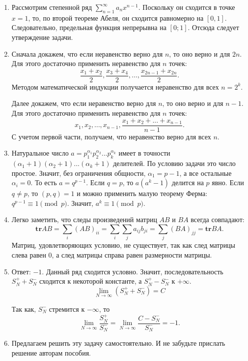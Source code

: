 \documentclass[11pt, a4paper]{article}
\begin{document}
\begin{enumerate}
\item Рассмотрим степенной ряд $\sum_{n=1}^{\infty} a_n x^{n-1}$. Поскольку он сходится в точке $x=1$, то, по второй теореме Абеля, он сходится равномерно на $[0, 1]$. Следовательно, предельная функция непрерывна на $[0; 1]$. Отсюда следует утверждение задачи.

\item Сначала докажем, что если неравенство верно для $n$, то оно верно и для $2n$. Для этого достаточно применить неравенство для $n$ точек:
$$\frac{x_1 + x_2}{2}, \frac{x_3 + x_4}{2}, \ldots, \frac{x_{2n-1} + x_{2n}}{2}.$$
Методом математической индукции получается неравенство для всех $n = 2^k$.

Далее докажем, что если неравенство верно для $n$, то оно верно и для $n-1$. Для этого достаточно применить неравенство для $n$ точек:
$$x_1, x_2, \ldots, x_{n-1}, \frac{x_1 + x_2 + ... + x_{n-1}}{n-1}.$$
С учетом первой части, получаем, что неравенство верно для всех $n$.

\item Натуральное число $a = p_1^{\alpha_1} p_2^{\alpha_2} ... p_k^{\alpha_k}$ имеет в точности $(\alpha_1 + 1) (\alpha_2 + 1) ... (\alpha_k + 1)$ делителей. По условию задачи это число простое. Значит,  без ограничения общности, $\alpha_1 = p - 1$, а все остальные $\alpha_i = 0$. То есть $a = q ^ {p-1}$. Если $q = p$, то $a (a^k - 1)$ делится на $p$ явно. Если $q \neq p$, то $(p, q) = 1$ и можно применить малую теорему Ферма: $q^{p-1} \equiv 1 \pmod p$. Значит, $a^k \equiv 1 \pmod p$.

\item Легко заметить, что следы произведений матриц $AB$ и $BA$ всегда совпадают:
$$\mathbf{tr} AB = \sum_i (AB)_{ii} = \sum_i \sum_j a_{ij} b_{ji} =  \sum_j (BA)_{jj} = \mathbf{tr} BA.$$
Матриц, удовлетворяющих условию, не существует, так как след матрицы слева равен 0, а след матрицы справа равен размерности матрицы.

\item Ответ: $-1$. Данный ряд сходится условно. Значит, последовательность $S_N^{+}+S_N^{-}$ сходится к некоторой константе, а $S_N^{+}-S_N^{-}$ к $+\infty$. $$\lim\limits_{N \rightarrow \infty}(S_N^{+}+S_N^{-}) = C$$

Так как, $S_N^{-}$ стремится к $-\infty$, то 
$$\lim\limits_{N \rightarrow \infty} \frac{S_N^{+}}{S_N^{-}} = \lim\limits_{N \rightarrow \infty} \frac{C - S_N^{-}}{S_N^{-}} = -1.$$

\item Предлагаем решить эту задачу самостоятельно. И не забудьте прислать решение авторам пособия.

\end{enumerate}
\end{document}
